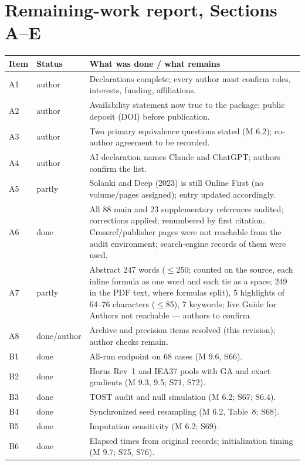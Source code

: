 \documentclass[11pt,a4paper]{article}
\begin{document}
\section*{Remaining-work report, Sections A--E}
\begin{longtable}{>{\raggedright\arraybackslash}p{}>{\raggedright\arraybackslash}p{}>{\raggedright\arraybackslash}p{}}
\toprule
Item & Status & What was done / what remains \\ \midrule
\endhead
A1 & author & Declarations complete; every author must confirm roles, interests, funding, affiliations. \\
A2 & author & Availability statement now true to the package; public deposit (DOI) before publication. \\
A3 & author & Two primary equivalence questions stated (M 6.2); co-author agreement to be recorded. \\
A4 & author & AI declaration names Claude and ChatGPT; authors confirm the list. \\
A5 & partly & Solanki and Deep (2023) is still Online First (no volume/pages assigned); entry updated accordingly. \\
A6 & done & All 88 main and 23 supplementary references audited; corrections applied; renumbered by first citation. Crossref/publisher pages were not reachable from the audit environment; search-engine records of them were used. \\
A7 & partly & Abstract 247 words ($\le$250; counted on the source, each inline formula as one word and each tie as a space; 249 in the PDF text, where formulas split), 5 highlights of 64--76 characters ($\le$85), 7 keywords; live Guide for Authors not reachable — authors to confirm. \\
A8 & done/author & Archive and precision items resolved (this revision); author checks remain. \\
B1 & done & All-run endpoint on 68 cases (M 9.6, S66). \\
B2 & done & Horns Rev~1 and IEA37 pools with GA and exact gradients (M 9.3, 9.5; S71, S72). \\
B3 & done & TOST audit and null simulation (M 6.2; S67; S6.4). \\
B4 & done & Synchronized seed resampling (M 6.2, Table~8; S68). \\
B5 & done & Imputation sensitivity (M 6.2; S69). \\
B6 & done & Elapsed times from original records; initialization timing (M 9.7; S75, S76). \\

\end{longtable}
\end{document}

